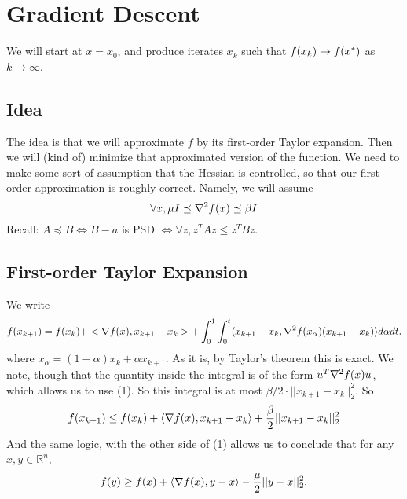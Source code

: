 \documentclass[11pt]{article}
\newcommand{\Rn}{\mathbb{R}^n}
\begin{document}
\section{Gradient Descent}
\newcommand{\flt}{\preceq}
We will start at $x = x_0$, and produce iterates $x_k$ such that $f(x_k) \to f(x^*)$ as $k \to \infty$. 

\subsection{Idea}
The idea is that we will approximate $f$ by its first-order Taylor expansion. Then we will (kind of) minimize that approximated version of the function.
We need to make some sort of assumption that the Hessian is controlled, so that our first-order approximation is roughly correct. Namely, we will assume
\begin{equation}
\forall x, \mu I \flt \hessian f(x) \flt \beta I
\end{equation}
Recall: $
A \flt B \iff B - a
$ is PSD $\iff \forall z, z^T A z \leq z^T B z$.

\subsection{First-order Taylor Expansion}
We write
\begin{equation}
f(x_{k+1}) = f(x_k) + <\nabla f(x), x_{k+1} - x_k> + \int_0^1 \int_0^t \langle x_{k+1} - x_k, \nabla^2 f(x_\alpha) (x_{k+1} - x_k)\rangle d\alpha dt.
\end{equation}
where $x_\alpha = (1-\alpha) x_k + \alpha x_{k+1}$.
As it is, by Taylor's theorem this is exact. We note, though
that the quantity inside the integral is of the form $u^T \nabla^2 f(x) u$, which allows us to use (1). So this integral is at most $\beta/2\cdot  ||x_{k+1} - x_k||_2^2$. So
\begin{equation}
f(x_{k+1}) \leq f(x_k) + \langle\nabla f(x), x_{k+1} - x_k\rangle + \frac{\beta}{2} ||x_{k+1} - x_k||_2^2
\end{equation}
And the same logic, with the other side of (1) allows us to conclude that for any $x, y \in \Rn$,
\begin{equation}
f(y) \geq f(x) + \langle\nabla f(x), y-x\rangle - \frac{\mu}{2} ||y-x||_2^2.
\end{equation}
\end{document}
